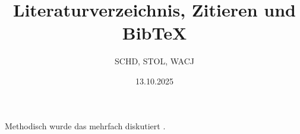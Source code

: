 \documentclass[a4paper,12pt]{article}
\title{Literaturverzeichnis, Zitieren und BibTeX}
\author{SCHD, STOL, WACJ}
\date{13.10.2025}
\begin{document}
  \maketitle

  \noindent
  Methodisch wurde das mehrfach diskutiert \parencite{einstein1905,knuth1984,lamport1994}.

  \printbibliography %
\end{document}
